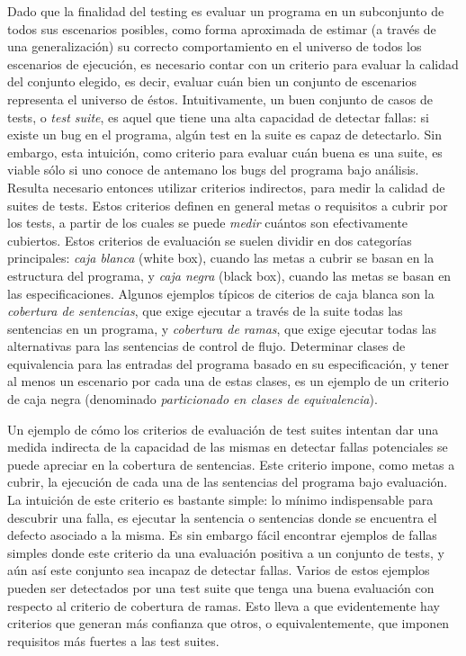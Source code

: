 Dado que la finalidad del testing es evaluar un programa en un subconjunto de todos sus escenarios posibles, como forma aproximada de estimar (a trav\'es de una generalizaci\'on) su correcto comportamiento en el universo de todos los escenarios de ejecuci\'on, es necesario contar con un criterio para evaluar la calidad del conjunto elegido, es decir, evaluar cu\'an bien un conjunto de escenarios representa el universo de \'estos. Intuitivamente, un buen conjunto de casos de tests, o \emph{test suite}, es aquel que tiene una alta capacidad de detectar fallas: si existe un bug en el programa, alg\'un test en la suite es capaz de detectarlo. Sin embargo, esta intuici\'on, como criterio para evaluar cu\'an buena es una suite, es viable s\'olo si uno conoce de antemano los bugs del programa bajo an\'alisis. 
Resulta necesario entonces utilizar criterios indirectos, para medir la calidad de suites de tests. Estos criterios definen en general metas o requisitos a cubrir por los tests, a partir de los cuales se puede \emph{medir} cu\'antos son efectivamente cubiertos. Estos criterios de evaluaci\'on se suelen dividir en dos categor\'ias principales: \emph{caja blanca} (white box), cuando las metas a cubrir se basan en la estructura del programa, y \emph{caja negra} (black box), cuando las metas se basan en las especificaciones. Algunos ejemplos t\'ipicos de citerios de caja blanca son la \emph{cobertura de sentencias}, que exige ejecutar a trav\'es de la suite todas las sentencias en un programa, y \emph{cobertura de ramas}, que exige ejecutar todas las alternativas para las sentencias de control de flujo. Determinar clases de equivalencia para las entradas del programa basado en su especificaci\'on, y tener al menos un escenario por cada una de estas clases, es un ejemplo de un criterio de caja negra (denominado \emph{particionado en clases de equivalencia}).

Un ejemplo de c\'omo los criterios de evaluaci\'on de test suites intentan dar una medida indirecta de la capacidad de las mismas en detectar fallas potenciales se puede apreciar en la cobertura de sentencias. Este criterio impone, como metas a cubrir, la ejecuci\'on de cada una de las sentencias del programa bajo evaluaci\'on. La intuici\'on de este criterio es bastante simple: lo m\'inimo indispensable para descubrir una falla, es ejecutar la sentencia o sentencias donde se encuentra el defecto asociado a la misma. Es sin embargo f\'acil encontrar ejemplos de fallas simples donde este criterio da una evaluaci\'on positiva a un conjunto de tests, y a\'un as\'i este conjunto sea incapaz de detectar fallas. Varios de estos ejemplos pueden ser detectados por una test suite que tenga una buena evaluaci\'on con respecto al criterio de cobertura de ramas. Esto lleva a que evidentemente hay criterios que generan m\'as confianza que otros, o equivalentemente, que imponen requisitos m\'as fuertes a las test suites. 

